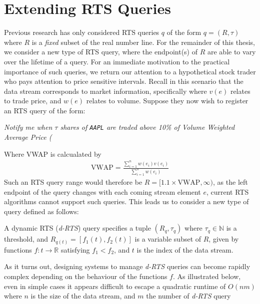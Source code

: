 \section{Extending RTS Queries}

Previous research has only considered RTS queries $q$ of the form $q = (R, \tau)$ where $R$ is a \textit{fixed} subset of the real number line. For the remainder of this thesis, we consider a new type of RTS query, where the endpoint(s) of $R$ are able to vary over the lifetime of a query. For an immediate motivation to the practical importance of such queries, we return our attention to a hypothetical stock trader who pays attention to price sensitive intervals. Recall in this scenario that the data stream corresponds to market information, specifically where $v(e)$ relates to trade price, and $w(e)$ relates to volume. Suppose they now wish to register an RTS query of the form: 
\begin{center}
    \textit{Notify me when $\tau$ shares of \texttt{AAPL} are traded above 10\% of Volume Weighted Average Price (}
\end{center}
Where VWAP is calcualated by 
\begin{align}
    \text{VWAP} = \frac{\sum_{i=1}^{n} w(e_i)v(e_i)}{\sum_{i=1}^{n}w(e_i)}
\end{align}
Such an RTS query range would therefore be $R = [1.1\times\text{VWAP}, \infty)$, as the left endpoint of the query changes with each coming stream element $e$, current RTS algorithms cannot support such queries. This leads us to consider a new type of query defined as follows:

\begin{definition} A dynamic RTS (\textit{d-RTS}) query specifies a tuple $(R_q, \tau_q)$ where $\tau_q \in \mathbb{N}$
    is a threshold, and $R_{q(t)} =[f_1(t), f_2(t)]$ is a variable subset of $R$, given by functions $f: t\rightarrow\mathbb{R}$ satisfying $f_1 < f_2$, and $t$ is the index of the data stream.
\end{definition}

As it turns out, designing systems to manage \textit{d-RTS} queries can become rapidly complex depending on the behaviour of the functions $f$. As illustrated below, even in simple cases it appears difficult to escape a quadratic runtime of $O(nm)$ where $n$ is the size of the data stream, and $m$ the number of \textit{d-RTS} query

